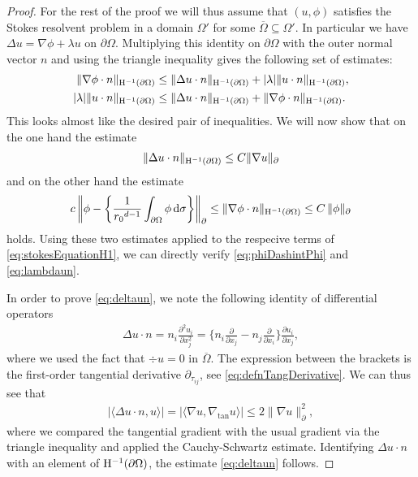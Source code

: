 \begin{proof}
  For the rest of the proof we will thus assume that $(u,\phi)$ satisfies the Stokes resolvent problem in a domain $\Omega'$ for some $\overline \Omega \subseteq \Omega'$.
  In particular we have $\Delta u = \nabla \phi + \lambda u$  on $\partial\Omega$.
  Multiplying this identity  on $\partial\Omega$ with the outer normal vector $n$ and using the triangle inequality gives the following set of estimates:
  \begin{align}
    \label{eq:stokesEquationH1}
    \begin{alignedat}{1}
    \|\nabla \phi \cdot n\|_{\mathrm{H}^{-1}(\partial\Omega)} 
    &\leq \|\Delta u \cdot n \|_{\mathrm{H}^{-1}(\partial\Omega)} + |\lambda| \| u\cdot n\|_{\mathrm{H}^{-1}(\partial\Omega)}, \\
    |\lambda| \| u\cdot n \|_{\mathrm{H}^{-1}(\partial\Omega)} 
    &\leq \|\Delta u \cdot n \|_{\mathrm{H}^{-1}(\partial\Omega)} + \|\nabla \phi \cdot n \|_{\mathrm{H}^{-1}(\partial\Omega)}.
    \end{alignedat}
  \end{align}
  This looks almost like the desired pair of inequalities.
  We will now show that on the one hand the estimate
  \begin{align}
    \label{eq:deltaun}
    \|\Delta u \cdot n\|_{\mathrm{H}^{-1}(\partial\Omega)}
    \leq C \|\nabla u\|_\partial
  \end{align}
  and on the other hand the estimate
  \begin{align}
    \label{eq:nablaPhin}
    c \, \bigg\|\phi - \bigg\{ \frac{1}{{r_0}^{d - 1}}\int_{\partial\Omega} \phi \, {\operatorname{d}\!{\sigma}} \bigg\} \bigg\|_\partial 
    \leq \|\nabla \phi \cdot n\|_{\mathrm{H}^{-1}(\partial\Omega)}
    \leq C\,  \|\phi\|_\partial
  \end{align}
  holds.
  Using these two estimates applied to the respecive terms of \eqref{eq:stokesEquationH1}, we can directly verify \eqref{eq:phiDashintPhi} and \eqref{eq:lambdaun}.

  In order to prove \eqref{eq:deltaun}, we note the following identity of differential operators
  \begin{align*}
    \Delta u \cdot n = n_i \frac{\partial^2 u_i}{\partial x_j^2} = \Big\{ n_i \frac{\partial}{\partial x_j} - n_j \frac{\partial}{\partial x_i} \Big\} \frac{\partial u_i}{\partial x_j},
  \end{align*}
  where we used the fact that $\div u = 0$ in $\overline \Omega$.
  The expression between the brackets is the first-order tangential derivative $\partial_{\tau_{ij}}$, see \eqref{eq:defnTangDerivative}. 
  We can thus see that
  \begin{align*}
    | \langle \Delta u \cdot n, u \rangle | = | \langle \nabla u, \nabla_{\mathrm{tan}} u \rangle| \leq 2 \|\nabla u\|_\partial^2,
  \end{align*}
  where we compared the tangential gradient with the usual gradient via the triangle inequality and applied the Cauchy-Schwartz estimate.  
  Identifying $\Delta u \cdot n$ with an element of $\mathrm{H}^{-1}(\partial\Omega)$, the estimate \eqref{eq:deltaun} follows. 


\end{proof}
